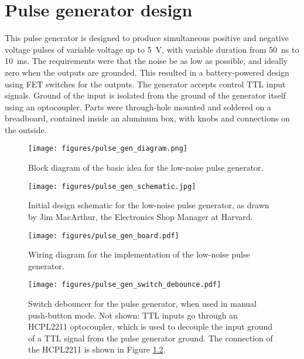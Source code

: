 \chapter{Pulse generator design}
\label{pulse_generator}

This pulse generator is designed to produce simultaneous positive and negative voltage pulses of variable voltage up to \SI{5}{\V}, with variable duration from \SI{50}{\ns} to \SI{10}{\ms}.  The requirements were that the noise be as low as possible, and ideally zero when the outputs are grounded.  This resulted in a battery-powered design using FET switches for the outputs.  The generator accepts control TTL input signals.  Ground of the input is isolated from the ground of the generator itself using an optocoupler.  Parts were through-hole mounted and soldered on a breadboard, contained inside an aluminum box, with knobs and connections on the outside.

\begin{figure}[h]
\begin{centering}
\texttt{[image: figures/pulse\_gen\_diagram.png]}
\caption[Pulse generator: block diagram]{Block diagram of the basic idea for the low-noise pulse generator.}
\label{fig:pulse_gen_diagram}
\end{centering}
\end{figure}

\begin{figure}[h]
\begin{centering}
\texttt{[image: figures/pulse\_gen\_schematic.jpg]}
\caption[Pulse generator: schematic]{Initial design schematic for the low-noise pulse generator, as drawn by Jim MacArthur, the Electronics Shop Manager at Harvard.}
\label{fig:pulse_gen_schematic}
\end{centering}
\end{figure}

\begin{figure}[h]
\begin{centering}
\texttt{[image: figures/pulse\_gen\_board.pdf]}
\caption[Pulse generator: circuit wiring diagram]{Wiring diagram for the implementation of the low-noise pulse generator.}
\label{fig:pulse_gen}
\end{centering}
\end{figure}

\begin{figure}[h]
\begin{centering}
\texttt{[image: figures/pulse\_gen\_switch\_debounce.pdf]}
\caption[Pulse generator: switch debouncer]{Switch debouncer for the pulse generator, when used in manual push-button mode.  Not shown: TTL inputs go through an HCPL2211 optocoupler, which is used to decouple the input ground of a TTL signal from the pulse generator ground.  The connection of the HCPL2211 is shown in Figure \ref{fig:pulse_gen_schematic}.}
\label{fig:pulse_gen_debounce}
\end{centering}
\end{figure}